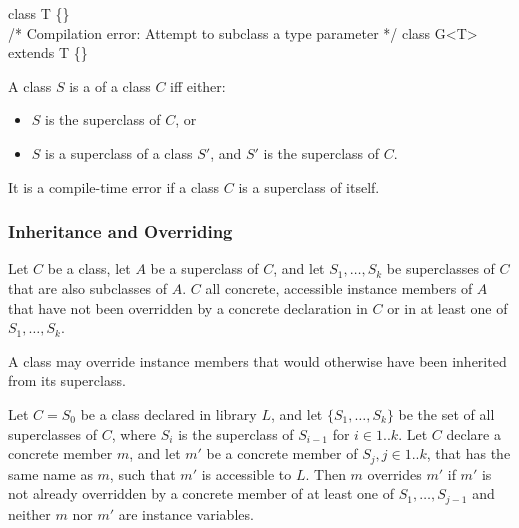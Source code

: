 \documentclass[makeidx]{article}
\begin{document}
\begin{dartCode}
class T \{\}
\\
/* Compilation error: Attempt to subclass a type parameter */
class G<T> extends T \{\}
\end{dartCode}

\LMHash{}%
A class $S$ is a  of a class $C$ if{}f either:
\begin{itemize}
\item $S$ is the superclass of $C$, or
\item $S$ is a superclass of a class $S'$,
and $S'$ is the superclass of $C$.
\end{itemize}

\LMHash{}%
It is a compile-time error if a class $C$ is a superclass of itself.


\subsubsection{Inheritance and Overriding}

\LMHash{}%
Let $C$ be a class, let $A$ be a superclass of $C$, and
let $S_1, \ldots, S_k$ be superclasses of $C$ that are also subclasses of $A$.
$C$  all concrete, accessible instance members of $A$
that have not been overridden by a concrete declaration in $C$ or in at least one of $S_1, \ldots, S_k$.


\LMHash{}%
A class may override instance members that would otherwise have been inherited from its superclass.

\LMHash{}%
Let $C = S_0$ be a class declared in library $L$, and
let $\{S_1, \ldots, S_k\}$ be the set of all superclasses of $C$,
where $S_i$ is the superclass of $S_{i-1}$ for $i \in 1 .. k$.
Let $C$ declare a concrete member $m$, and
let $m'$ be a concrete member of $S_j, j \in 1 .. k$, that has the same name as $m$,
such that $m'$ is accessible to $L$.
Then $m$ overrides $m'$
if $m'$ is not already overridden by a concrete member of at least one of $S_1, \ldots, S_{j-1}$
and neither $m$ nor $m'$ are instance variables.
\end{document}
